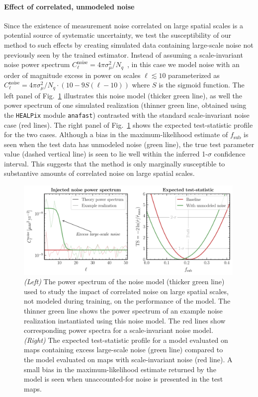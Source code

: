\documentclass[preprint]{article}
\begin{document}
\paragraph{Effect of correlated, unmodeled noise} Since the existence of measurement noise correlated on large spatial scales is a potential source of systematic uncertainty, we test the susceptibility of our method to such effects by creating simulated data containing large-scale noise not previously seen by the trained estimator. Instead of assuming a scale-invariant noise power spectrum $C_\ell^\mathrm{noise} = 4\pi \sigma_{\mu}^2 / N_q$~\cite{Mishra-Sharma:2020ynk}, in this case we model noise with an order of magnitude excess in power on scales $\ell \lesssim 10$ parameterized as $C_\ell^\mathrm{noise} = 4\pi\sigma_{\mu}^2 / N_q \cdot \left(10 - 9 S(\ell - 10)\right)$ where $S$ is the sigmoid function.
The left panel of Fig.~\ref{fig:noise_test} illustrates this noise model (thicker green line), as well the power spectrum of one simulated realization (thinner green line, obtained using the \texttt{HEALPix} module \texttt{anafast}) contrasted with the standard scale-invariant noise case (red lines). The right panel of Fig.~\ref{fig:noise_test} shows the expected test-statistic profile for the two cases. Although a bias in the maximum-likelihood estimate of $f_\mathrm{sub}$ is seen when the test data has unmodeled noise (green line), the true test parameter value (dashed vertical line) is seen to lie well within the inferred 1-$\sigma$ confidence interval. This suggests that the method is only marginally susceptible to substantive amounts of correlated noise on large spatial scales.

\begin{figure}[!htbp]
\centering
\includegraphics[width=0.99\textwidth]{figures/lowell_noise}
\caption{\emph{(Left)} The power spectrum of the noise model (thicker green line) used to study the impact of correlated noise on large spatial scales, not modeled during training, on the performance of the model. The thinner green line shows the power spectrum of an example noise realization instantiated using this noise model. The red lines show corresponding power spectra for a scale-invariant noise model.  \emph{(Right)} The expected  test-statistic profile for a model evaluated on maps containing excess large-scale noise (green line) compared to the model evaluated on maps with scale-invariant noise (red line). A small bias in the maximum-likelihood estimate returned by the model is seen when unaccounted-for noise is presented in the test maps.}
\label{fig:noise_test}
\end{figure}
\end{document}
